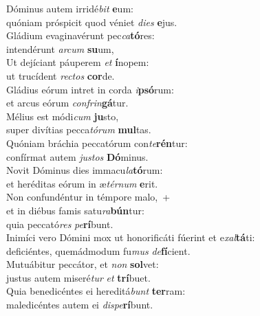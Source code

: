 \oddverse Dóminus autem irridé\textit{bit} \textbf{e}um:~\*\\
\oddverse quóniam próspicit quod véniet \textit{di}\textit{es} \textbf{e}jus.\\
\evenverse Gládium evaginavérunt pec\textit{ca}\textbf{tó}res:~\*\\
\evenverse intendérunt \textit{ar}\textit{cum} \textbf{su}um,\\
\oddverse Ut dejíciant páuperem \textit{et} \textbf{í}nopem:~\*\\
\oddverse ut trucídent \textit{re}\textit{ctos} \textbf{cor}de.\\
\evenverse Gládius eórum intret in corda \textit{i}\textbf{psó}rum:~\*\\
\evenverse et arcus eórum \textit{con}\textit{frin}\textbf{gá}tur.\\
\oddverse Mélius est módi\textit{cum} \textbf{ju}sto,~\*\\
\oddverse super divítias pecca\textit{tó}\textit{rum} \textbf{mul}tas.\\
\evenverse Quóniam bráchia peccatórum con\textit{te}\textbf{rén}tur:~\*\\
\evenverse confírmat autem \textit{ju}\textit{stos} \textbf{Dó}minus.\\
\oddverse Novit Dóminus dies immacu\textit{la}\textbf{tó}rum:~\*\\
\oddverse et heréditas eórum in æ\textit{tér}\textit{num} \textbf{e}rit.\\
\evenverse Non confundéntur in témpore malo,~+\\
\evenverse  et in diébus famis satu\textit{ra}\textbf{bún}tur:~\*\\
\evenverse quia peccató\textit{res} \textit{pe}\textbf{rí}bunt.\\
\oddverse Inimíci vero Dómini mox ut honorificáti fúerint et e\textit{xal}\textbf{tá}ti:~\*\\
\oddverse deficiéntes, quemádmodum fu\textit{mus} \textit{de}\textbf{fí}cient.\\
\evenverse Mutuábitur peccátor, et \textit{non} \textbf{sol}vet:~\*\\
\evenverse justus autem miseré\textit{tur} \textit{et} \textbf{trí}buet.\\
\oddverse Quia benedicéntes ei hereditá\textit{bunt} \textbf{ter}ram:~\*\\
\oddverse maledicéntes autem ei \textit{di}\textit{spe}\textbf{rí}bunt.\\
